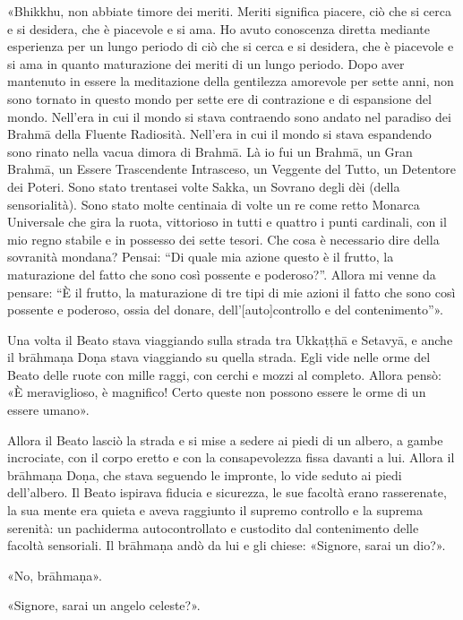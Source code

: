 «Bhikkhu, non abbiate timore dei meriti. Meriti significa piacere, ciò che si
cerca e si desidera, che è piacevole e si ama. Ho avuto conoscenza diretta
mediante esperienza per un lungo periodo di ciò che si cerca e si desidera, che
è piacevole e si ama in quanto maturazione dei meriti di un lungo periodo. Dopo
aver mantenuto in essere la meditazione della gentilezza amorevole per sette
anni, non sono tornato in questo mondo per sette ere di contrazione e di
espansione del mondo. Nell’era in cui il mondo si stava contraendo sono andato
nel paradiso dei Brahmā della Fluente Radiosità. Nell’era in cui il mondo si
stava espandendo sono rinato nella vacua dimora di Brahmā. Là io fui un Brahmā,
un Gran Brahmā, un Essere Trascendente Intrasceso, un Veggente del Tutto, un
Detentore dei Poteri. Sono stato trentasei volte Sakka, un Sovrano degli dèi
(della sensorialità). Sono stato molte centinaia di volte un re come retto
Monarca Universale che gira la ruota, vittorioso in tutti e quattro i punti
cardinali, con il mio regno stabile e in possesso dei sette tesori. Che cosa è
necessario dire della sovranità mondana? Pensai: “Di quale mia azione questo è
il frutto, la maturazione del fatto che sono così possente e poderoso?”. Allora
mi venne da pensare: “È il frutto, la maturazione di tre tipi di mie azioni il
fatto che sono così possente e poderoso, ossia del donare, dell’[auto]controllo
e del contenimento”».


Una volta il Beato stava viaggiando sulla strada tra Ukkaṭṭhā e Setavyā, e anche
il brāhmaṇa Doṇa stava viaggiando su quella strada. Egli vide nelle orme del
Beato delle ruote con mille raggi, con cerchi e mozzi al completo. Allora pensò:
«È meraviglioso, è magnifico! Certo queste non possono essere le orme di un
essere umano».

Allora il Beato lasciò la strada e si mise a sedere ai piedi di un albero, a
gambe incrociate, con il corpo eretto e con la consapevolezza fissa davanti a
lui. Allora il brāhmaṇa Doṇa, che stava seguendo le impronte, lo vide seduto ai
piedi dell’albero. Il Beato ispirava fiducia e sicurezza, le sue facoltà erano
rasserenate, la sua mente era quieta e aveva raggiunto il supremo controllo e la
suprema serenità: un pachiderma autocontrollato e custodito dal contenimento
delle facoltà sensoriali. Il brāhmaṇa andò da lui e gli chiese: «Signore, sarai
un dio?».

«No, brāhmaṇa».

«Signore, sarai un angelo celeste?».

